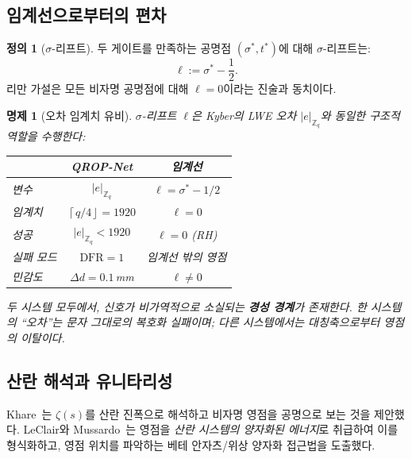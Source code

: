 \documentclass[11pt, a4paper]{article}
\theoremstyle{definition}
\newtheorem{definition}{정의}[section]
\theoremstyle{plain}
\newtheorem{proposition}[theorem]{명제}
\newcommand{\Zq}{\mathbb{Z}_q}
\newcommand{\ceil}[1]{\left\lceil#1\right\rfloor}
\begin{document}
\subsection{임계선으로부터의 편차}

\begin{definition}[$\sigma$-리프트]
\label{def:sigma_lift}
두 게이트를 만족하는 공명점 $(\sigma^*, t^*)$에 대해 $\sigma$-리프트는:
\begin{equation}
  \ell := \sigma^* - \frac{1}{2}.
  \label{eq:sigma_lift}
\end{equation}
리만 가설은 모든 비자명 공명점에 대해 $\ell = 0$이라는 진술과 동치이다.
\end{definition}

\begin{proposition}[오차 임계치 유비]
\label{prop:threshold}
$\sigma$-리프트 $\ell$은 Kyber의 LWE 오차 $|e|_{\Zq}$와 동일한 구조적 역할을 수행한다:
\begin{center}
\begin{tabular}{lcc}
\toprule
& \textbf{QROP-Net} & \textbf{임계선} \\
\midrule
변수         & $|e|_{\Zq}$            & $\ell = \sigma^* - 1/2$ \\
임계치       & $\ceil{q/4} = 1920$    & $\ell = 0$ \\
성공         & $|e|_{\Zq} < 1920$     & $\ell = 0$ (RH) \\
실패 모드    & $\mathrm{DFR} = 1$     & 임계선 밖의 영점 \\
민감도       & $\Delta d = 0.1\,$mm   & $\ell \neq 0$ \\
\bottomrule
\end{tabular}
\end{center}
두 시스템 모두에서, 신호가 비가역적으로 소실되는 \textbf{경성 경계}가 존재한다. 한 시스템의 ``오차''는 문자 그대로의 복호화 실패이며; 다른 시스템에서는 대칭축으로부터 영점의 이탈이다.
\end{proposition}


\subsection{산란 해석과 유니타리성}

Khare~\cite{khare1997}는 $\zeta(s)$를 산란 진폭으로 해석하고 비자명 영점을 공명으로 보는 것을 제안했다. LeClair와 Mussardo~\cite{leclair2023}는 영점을 \textit{산란 시스템의 양자화된 에너지}로 취급하여 이를 형식화하고, 영점 위치를 파악하는 베테 안자츠/위상 양자화 접근법을 도출했다.
\end{document}
